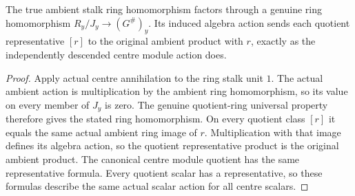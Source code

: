\begin{definition}
\label{hir:real-domain-actual-normal-associated-ring-sheaf-centre-ring-map}
\leanok
The true ambient stalk ring homomorphism factors through a genuine ring
homomorphism $R_y/J_y\to(G^{\#})_y$. Its induced algebra action sends
each quotient representative $[r]$ to the original ambient product with
$r$, exactly as the independently descended centre module action does.
\end{definition}
\begin{proof}
Apply actual centre annihilation to the ring stalk unit $1$. The actual
ambient action is multiplication by the ambient ring homomorphism, so
its value on every member of $J_y$ is zero. The genuine quotient-ring
universal property therefore gives the stated ring homomorphism. On
every quotient class $[r]$ it equals the same actual ambient ring image
of $r$. Multiplication with that image defines its algebra action, so
the quotient representative product is the original ambient product.
The canonical centre module quotient has the same representative
formula. Every quotient scalar has a representative, so these formulas
describe the same actual scalar action for all centre scalars.
\end{proof}

